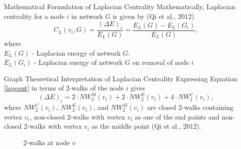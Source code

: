 \documentclass[10pt]{beamer}
\begin{document}
\begin{frame}{Mathematical Formulation of Laplacian Centrality}
	Mathematically, Laplacian centrality for a node $i$ in network $G$ is given by (Qi et al., 2012) \\
	\vspace{0.2cm}
	\begin{equation}
	C_L(v_i,G) = \frac{(\Delta E)_i}{E_L(G)} = \frac{E_L(G) - E_L(G_i)}{E_L(G)},
	\label{lapcent}
	\end{equation}
	where \\
	$E_L(G)$ - Laplacian energy of network $G$.\\
	$E_L(G_i)$ - Laplacian energy of network $G$ on removal of node $i$
\end{frame}

\begin{frame}{Graph Theoretical Interpretation of Laplacian Centrality}
	Expressing Equation \ref*{lapcent} in terms of $2$-walks of the node $i$ gives
	\begin{equation}
	(\Delta E)_i = 2\cdot NW_{2} ^M(v_i) + 2 \cdot NW_{2} ^E(v_i) + 4 \cdot NW_{2} ^C(v_i), 
	\end{equation}
	\vspace{0.3cm}
	where 
	$NW_{2} ^C(v_i)$, $NW_{2} ^E(v_i)$, and $NW_{2} ^M(v_i)$ are closed $2$-walks containing vertex $v_i$, non-closed $2$-walks with vertex $v_i$ as one of the end points and non-closed $2$-walks with vertex $v_i$ as the middle point
	(Qi et al., 2012).
	
	\begin{figure}[!h]
		\centering
		\caption{$2$-walks at node $v$}
	\end{figure}
	
\end{frame}
\end{document}
